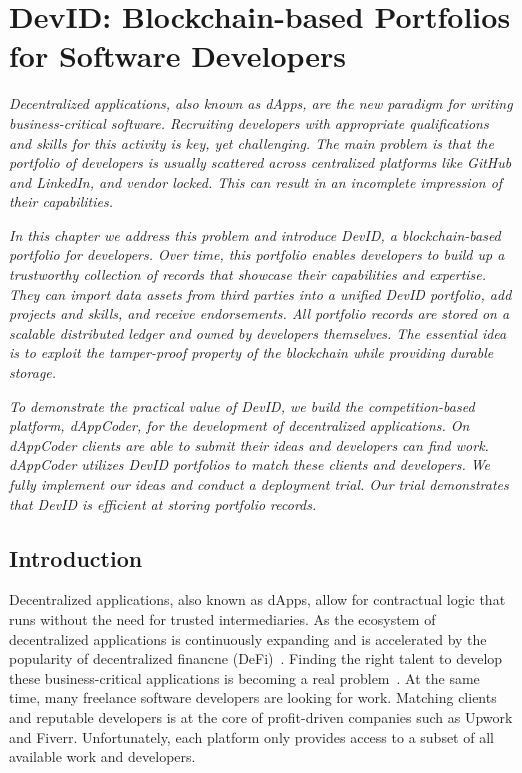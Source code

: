 \chapter{DevID: Blockchain-based Portfolios for Software Developers}
\label{chapter:devid}

\emph{Decentralized applications, also known as dApps, are the new paradigm for writing business-critical software.
Recruiting developers with appropriate qualifications and skills for this activity is key, yet challenging.
The main problem is that the portfolio of developers is usually scattered across centralized platforms like GitHub and LinkedIn, and vendor locked.
This can result in an incomplete impression of their capabilities. }

\emph{In this chapter we address this problem and introduce \emph{DevID}, a blockchain-based portfolio for developers.
Over time, this portfolio enables developers to build up a trustworthy collection of records that showcase their capabilities and expertise.
They can import data assets from third parties into a unified DevID portfolio, add projects and skills, and receive endorsements.
All portfolio records are stored on a scalable distributed ledger and owned by developers themselves.
The essential idea is to exploit the tamper-proof property of the blockchain while providing durable storage.}

\emph{To demonstrate the practical value of DevID, we build the competition-based platform, \emph{dAppCoder}, for the development of decentralized applications.
On dAppCoder clients are able to submit their ideas and developers can find work.
dAppCoder utilizes DevID portfolios to match these clients and developers.
We fully implement our ideas and conduct a deployment trial.
Our trial demonstrates that DevID is efficient at storing portfolio records. }

\newpage

\section{Introduction}
\label{sec:introduction}
Decentralized applications, also known as dApps, allow for contractual logic that runs without the need for trusted intermediaries.
As the ecosystem of decentralized applications is continuously expanding and is accelerated by the popularity of decentralized financne (DeFi)~\cite{zetzsche2020decentralized}.
Finding the right talent to develop these business-critical applications is becoming a real problem~\cite{shortage2016nasdaq}.
At the same time, many freelance software developers are looking for work.
Matching clients and reputable developers is at the core of profit-driven companies such as Upwork and Fiverr.
Unfortunately, each platform only provides access to a subset of all available work and developers.

